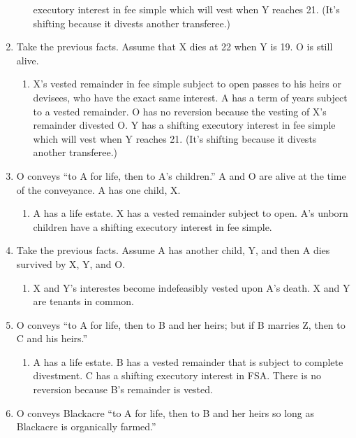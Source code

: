 \begin{enumerate}
\begin{enumerate}
        executory interest in fee simple which will vest when Y reaches 21. 
        (It's shifting because it divests another transferee.)
    \end{enumerate}
    \item Take the previous facts. Assume that X dies at 22 when Y is 19. O is 
    still alive.
    \begin{enumerate}
        \item X's vested remainder in fee simple subject to open passes to his 
        heirs or devisees, who have the exact same interest. A has a term of 
        years subject to a vested remainder. O has no reversion because the 
        vesting of X's remainder divested O. Y has a shifting executory 
        interest in fee simple which will vest when Y reaches 21. (It's 
        shifting because it divests another transferee.)
    \end{enumerate}
    \item O conveys ``to A for life, then to A's children.'' A and O are alive 
    at the time of the conveyance. A has one child, X.
    \begin{enumerate}
        \item A has a life estate. X has a vested remainder subject to open. 
        A's unborn children have a shifting executory interest in fee simple.
    \end{enumerate}
    \item Take the previous facts. Assume A has another child, Y, and then A 
    dies survived by X, Y, and O. 
    \begin{enumerate}
        \item X and Y's interestes become indefeasibly vested upon A's death. 
        X and Y are tenants in common.
    \end{enumerate}
    \item O conveys ``to A for life, then to B and her heirs; but if B marries 
    Z, then to C and his heirs.''
    \begin{enumerate}
        \item A has a life estate. B has a vested remainder that is subject to 
        complete divestment. C has a shifting executory interest in FSA. There 
        is no reversion because B's remainder is vested.
    \end{enumerate}
    \item O conveys Blackacre ``to A for life, then to B and her heirs so long 
    as Blackacre is organically farmed.''
    \begin{enumerate}

\end{enumerate}
\end{enumerate}
